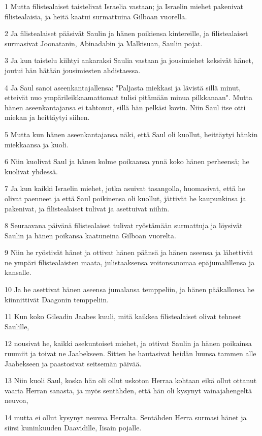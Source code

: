 \par 1 Mutta filistealaiset taistelivat Israelia vastaan; ja Israelin miehet pakenivat filistealaisia, ja heitä kaatui surmattuina Gilboan vuorella.
\par 2 Ja filistealaiset pääsivät Saulin ja hänen poikiensa kintereille, ja filistealaiset surmasivat Joonatanin, Abinadabin ja Malkisuan, Saulin pojat.
\par 3 Ja kun taistelu kiihtyi ankaraksi Saulia vastaan ja jousimiehet keksivät hänet, joutui hän hätään jousimiesten ahdistaessa.
\par 4 Ja Saul sanoi aseenkantajallensa: "Paljasta miekkasi ja lävistä sillä minut, etteivät nuo ympärileikkaamattomat tulisi pitämään minua pilkkanaan". Mutta hänen aseenkantajansa ei tahtonut, sillä hän pelkäsi kovin. Niin Saul itse otti miekan ja heittäytyi siihen.
\par 5 Mutta kun hänen aseenkantajansa näki, että Saul oli kuollut, heittäytyi hänkin miekkaansa ja kuoli.
\par 6 Niin kuolivat Saul ja hänen kolme poikaansa ynnä koko hänen perheensä; he kuolivat yhdessä.
\par 7 Ja kun kaikki Israelin miehet, jotka asuivat tasangolla, huomasivat, että he olivat paenneet ja että Saul poikinensa oli kuollut, jättivät he kaupunkinsa ja pakenivat, ja filistealaiset tulivat ja asettuivat niihin.
\par 8 Seuraavana päivänä filistealaiset tulivat ryöstämään surmattuja ja löysivät Saulin ja hänen poikansa kaatuneina Gilboan vuorelta.
\par 9 Niin he ryöstivät hänet ja ottivat hänen päänsä ja hänen aseensa ja lähettivät ne ympäri filistealaisten maata, julistaaksensa voitonsanomaa epäjumalillensa ja kansalle.
\par 10 Ja he asettivat hänen aseensa jumalansa temppeliin, ja hänen pääkallonsa he kiinnittivät Daagonin temppeliin.
\par 11 Kun koko Gileadin Jaabes kuuli, mitä kaikkea filistealaiset olivat tehneet Saulille,
\par 12 nousivat he, kaikki asekuntoiset miehet, ja ottivat Saulin ja hänen poikainsa ruumiit ja toivat ne Jaabekseen. Sitten he hautasivat heidän luunsa tammen alle Jaabekseen ja paastosivat seitsemän päivää.
\par 13 Niin kuoli Saul, koska hän oli ollut uskoton Herraa kohtaan eikä ollut ottanut vaaria Herran sanasta, ja myös sentähden, että hän oli kysynyt vainajahengeltä neuvoa,
\par 14 mutta ei ollut kysynyt neuvoa Herralta. Sentähden Herra surmasi hänet ja siirsi kuninkuuden Daavidille, Iisain pojalle.

